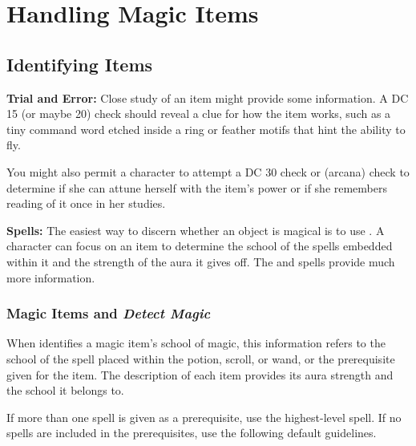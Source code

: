 \section{Handling Magic Items}

\subsection{Identifying Items}
\textbf{Trial and Error:} Close study of an item might provide some information. A DC 15 (or maybe 20)  check should reveal a clue for how the item works, such as a tiny command word etched inside a ring or feather motifs that hint the ability to fly.

You might also permit a character to attempt a DC 30  check or  (arcana) check to determine if she can attune herself with the item's power or if she remembers reading of it once in her studies.

\textbf{Spells:} The easiest way to discern whether an object is magical is to use . A character can focus on an item to determine the school of the spells embedded within it and the strength of the aura it gives off. The  and  spells provide much more information.

\subsubsection{Magic Items and \emph{Detect Magic}}
When  identifies a magic item's school of magic, this information refers to the school of the spell placed within the potion, scroll, or wand, or the prerequisite given for the item. The description of each item provides its aura strength and the school it belongs to.

If more than one spell is given as a prerequisite, use the highest-level spell. If no spells are included in the prerequisites, use the following default guidelines.



